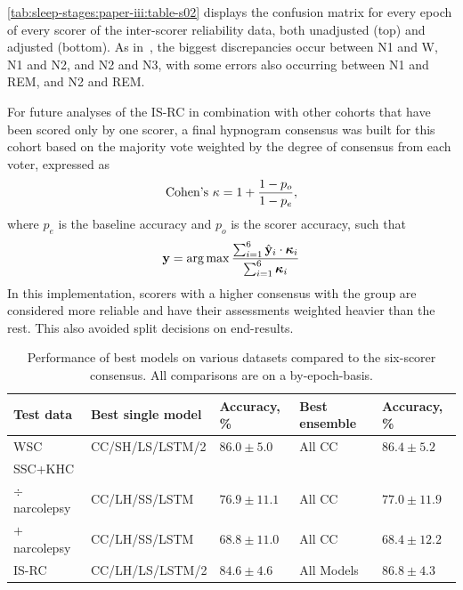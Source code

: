 \cref{tab:sleep-stages:paper-iii:table-s02} displays the confusion matrix for every epoch of every scorer of the inter-scorer reliability data, both unadjusted (top) and adjusted (bottom).
As in~\cite{Rosenberg2013}, the biggest discrepancies occur between \ac{N1} and \ac{W}, \ac{N1} and \ac{N2}, and \ac{N2} and \ac{N3}, with some errors also occurring between \ac{N1} and \ac{REM}, and \ac{N2} and \ac{REM}.

For future analyses of the \ac{IS-RC} in combination with other cohorts that have been scored only by one scorer, a final hypnogram consensus was built for this cohort based on the majority vote weighted by the degree of consensus from each voter, expressed as 
\begin{equation}
    \text{Cohen's~\ensuremath{\kappa}}= 1 + \frac{1 - p_o}{1 - p_e},
\end{equation}
where $p_e$ is the baseline accuracy and $p_o$ is the scorer accuracy, such that
\begin{equation}
    \mathbf{y} = \operatorname*{arg\,max} \frac{\sum_{i=1}^{6} \hat{\mathbf{y}}_i \cdot \boldsymbol{\kappa}_i}{\sum_{i=1}^{6} \boldsymbol{\kappa}_i}
\end{equation}
In this implementation, scorers with a higher consensus with the group are considered more reliable and have their assessments weighted heavier than the rest.
This also avoided split decisions on end-results.

\begin{table}
    \caption[\acs{STAGES} test performance]{Performance of best models on various datasets compared to the six-scorer consensus. All comparisons are on a by-epoch-basis.}
    \label{tab:sleep-stages:paper-iii:table-02}
    \small
    \begin{tabular}{@{}lllll@{}}
        \toprule
        \textbf{Test data}          & \textbf{Best single model} & \textbf{Accuracy, \%} & \textbf{Best ensemble} & \textbf{Accuracy}, \% \\ \midrule
        \ac{WSC}                & \ac{CC}/SH/LS/\ac{LSTM}/2   & $86.0 \pm 5.0$       & All \ac{CC}        & $86.4 \pm 5.2$       \\
        \ac{SSC}+\ac{KHC} & & & & \\
        \quad $\div$ narcolepsy            & \ac{CC}/LH/SS/\ac{LSTM}     & $76.9 \pm 11.1$      & All \ac{CC}        & $77.0 \pm 11.9$      \\
        \quad $+$ narcolepsy & \ac{CC}/LH/SS/\ac{LSTM}     & $68.8 \pm 11.0$      & All \ac{CC}        & $68.4 \pm 12.2$      \\
        \ac{IS-RC}              & \ac{CC}/LH/LS/\ac{LSTM}/2   & $84.6 \pm 4.6$       & All Models    & $86.8 \pm 4.3$       \\ \bottomrule
    \end{tabular}
\end{table}

